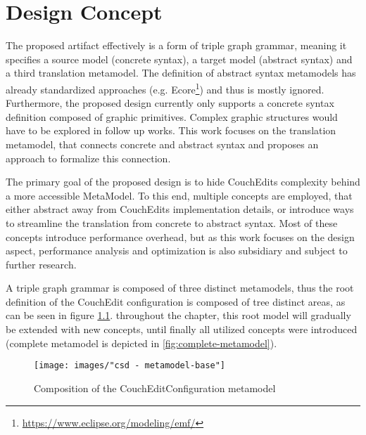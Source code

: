 \chapter{Design Concept}
\label{chap:design}
The proposed artifact effectively is a form of triple graph grammar, meaning it specifies a source model (concrete syntax), a target model (abstract syntax) and a third translation metamodel. The definition of abstract syntax metamodels has already standardized approaches (e.g. Ecore\footnote{\url{https://www.eclipse.org/modeling/emf/}}) and thus is mostly ignored. Furthermore, the proposed design currently only supports a concrete syntax definition composed of graphic primitives. Complex graphic structures would have to be explored in follow up works. This work focuses on the translation metamodel, that connects concrete and abstract syntax and proposes an approach to formalize this connection.

The primary goal of the proposed design is to hide CouchEdits complexity behind a more accessible MetaModel. To this end, multiple concepts are employed, that either abstract away from CouchEdits implementation details, or introduce ways to streamline the translation from concrete to abstract syntax. Most of these concepts introduce performance overhead, but as this work focuses on the design aspect, performance analysis and optimization is also subsidiary and subject to further research.


A triple graph grammar is composed of three distinct metamodels, thus the root definition of the CouchEdit configuration is composed of tree distinct areas, as can be seen in figure \ref{fig:metamodel-base}. throughout the chapter, this root model will gradually be extended with new concepts, until finally all utilized concepts were introduced (complete metamodel is depicted in \ref{fig:complete-metamodel}).

\begin{figure}
  \centering
  \texttt{[image: images/"csd - metamodel-base"]}
  \caption{Composition of the CouchEditConfiguration metamodel}
  \label{fig:metamodel-base}
\end{figure}

